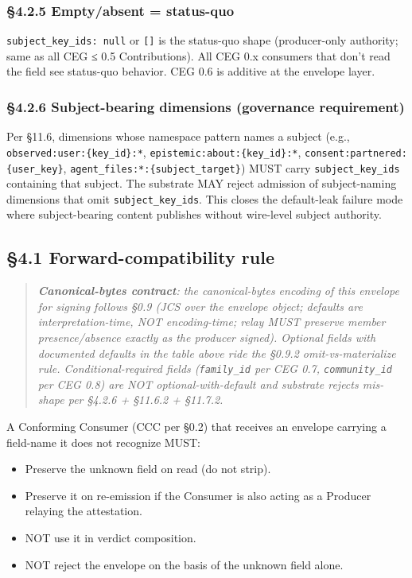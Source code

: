 \documentclass[11pt]{article}
\begin{document}
\subsubsection*{§4.2.5 Empty/absent = status-quo}


\texttt{subject\_key\_ids: null} or \texttt{[]} is the status-quo shape (producer-only authority; same as all CEG ≤ 0.5 Contributions). All CEG 0.x consumers that don't read the field see status-quo behavior. CEG 0.6 is additive at the envelope layer.


\subsubsection*{§4.2.6 Subject-bearing dimensions (governance requirement)}


Per §11.6, dimensions whose namespace pattern names a subject (e.g., \texttt{observed:user:\{key\_id\}:*}, \texttt{epistemic:about:\{key\_id\}:*}, \texttt{consent:partnered:\{user\_key\}}, \texttt{agent\_files:*:\{subject\_target\}}) MUST carry \texttt{subject\_key\_ids} containing that subject. The substrate MAY reject admission of subject-naming dimensions that omit \texttt{subject\_key\_ids}. This closes the default-leak failure mode where subject-bearing content publishes without wire-level subject authority.


\subsection*{§4.1 Forward-compatibility rule}


\begin{quote}\itshape \textbf{Canonical-bytes contract}: the canonical-bytes encoding of this envelope for signing follows §0.9 (JCS over the envelope object; defaults are interpretation-time, NOT encoding-time; relay MUST preserve member presence/absence exactly as the producer signed). Optional fields with documented defaults in the table above ride the §0.9.2 omit-vs-materialize rule. Conditional-required fields (\texttt{family\_id} per CEG 0.7, \texttt{community\_id} per CEG 0.8) are NOT optional-with-default and substrate rejects mis-shape per §4.2.6 + §11.6.2 + §11.7.2.\end{quote}




A Conforming Consumer (CCC per §0.2) that receives an envelope carrying a field-name it does not recognize MUST:


\begin{itemize}\setlength\itemsep{0pt}
\item Preserve the unknown field on read (do not strip).
\item Preserve it on re-emission if the Consumer is also acting as a Producer relaying the attestation.
\item NOT use it in verdict composition.
\item NOT reject the envelope on the basis of the unknown field alone.
\end{itemize}
\end{document}
